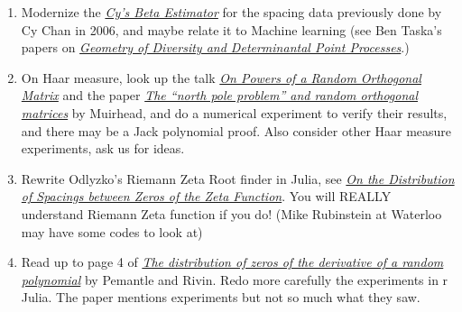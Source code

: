 \documentclass{article}
\begin{document}
\begin{enumerate}
    \item Modernize the \href{http://people.csail.mit.edu/cychan/BetaEstimator.html}{\emph{\color{blue}Cy's Beta Estimator}} for the spacing data previously done by Cy Chan in 2006, and maybe relate it to Machine learning (see Ben Taska's papers on \href{http://www.seas.upenn.edu/~taskar/}{\emph{\color{blue}Geometry of Diversity and Determinantal Point Processes}}.)
    \item On Haar measure, look up the talk \href{http://web.mit.edu/sea06/agenda/talks/Muirhead.pdf}{\emph{\color{blue}On Powers of a Random Orthogonal Matrix}} and the paper \href{http://arxiv.org/abs/0811.2678}{\emph{\color{blue}The ``north pole problem'' and random orthogonal matrices}} by Muirhead, and do a numerical experiment to verify their results, and there may be a Jack polynomial proof. Also consider other Haar measure experiments, ask us for ideas.
    \item Rewrite Odlyzko's Riemann Zeta Root finder in Julia, see \href{http://www.dtc.umn.edu/~odlyzko/doc/arch/zeta.zero.spacing.pdf}{\emph{\color{blue}On the Distribution of Spacings between Zeros of the Zeta Function}}. You will REALLY understand Riemann Zeta function if you do! (Mike Rubinstein at Waterloo may have some codes to look at)
    \item Read up to page 4 of \href{http://www.math.upenn.edu/~pemantle/papers/Preprints/zeros.pdf}{\emph{\color{blue}The distribution of zeros of the derivative of a random polynomial}} by Pemantle and Rivin. Redo more carefully the experiments in r Julia. The paper mentions experiments but not so much what they saw.
\end{enumerate}
\end{document}
